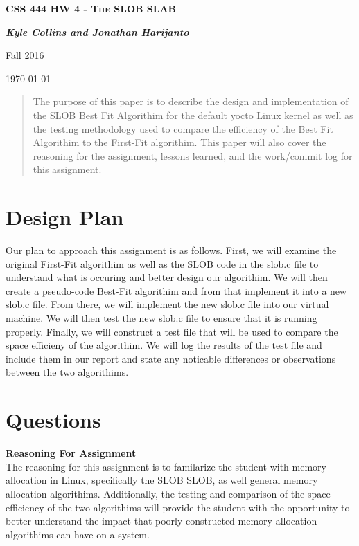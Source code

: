 \documentclass[letterpaper,10pt,draftclsnofoot,titlepage,onecolumn]{IEEEtran}
\begin{document}
	
	\begin{titlepage}
		\centering
		{\scshape\LARGE \textbf{CSS 444 HW 4 - The SLOB SLAB}\par}
		{\LARGE\itshape \textbf{Kyle Collins and Jonathan Harijanto}\par}
		{\LARGE Fall 2016\par}
		{\LARGE \today\par}
		
	\vfill		
		
\begin{abstract}
The purpose of this paper is to describe the design and implementation of the SLOB Best Fit Algorithim for the default yocto Linux kernel as well as the testing methodology used to compare the efficiency of the Best Fit Algorithim to the First-Fit algorithim. This paper will also cover the reasoning for the assignment, lessons learned, and the work/commit log for this assignment. 
\end{abstract}
		
\end{titlepage}
	
\clearpage
\tableofcontents
	
\clearpage
\section{Design Plan}

	Our plan to approach this assignment is as follows. First, we will examine the original First-Fit algorithim as well as the SLOB code in the slob.c file to understand what is occuring and better design our algorithim. We will then create a pseudo-code Best-Fit algorithim and from that implement it into a new slob.c file. From there, we will implement the new slob.c file into our virtual machine. We will then test the new slob.c file to ensure that it is running properly. Finally, we will construct a test file that will be used to compare the space efficieny of the algorithim. We will log the results of the test file and include them in our report and state any noticable differences or observations between the two algorithims. 
 
\clearpage
	\section{Questions}
	
	\textbf{Reasoning For Assignment}\\
	
	The reasoning for this assignment is to familarize the student with memory allocation in Linux, specifically the SLOB SLOB, as well general memory allocation algorithims. Additionally, the testing and comparison of the space efficiency of the two algorithims will provide the student with the opportunity to better understand the impact that poorly constructed memory allocation algorithims can have on a system. 
\end{document}
